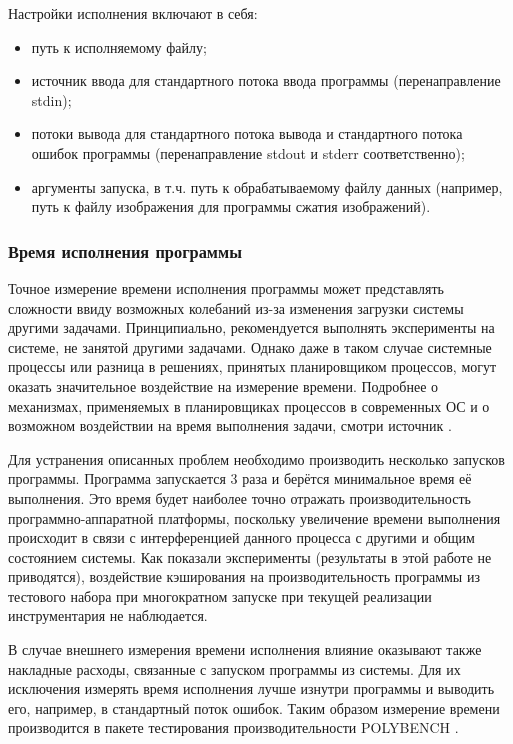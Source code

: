\begin{samepage}
Настройки исполнения включают в себя:
\nopagebreak
\begin{itemize}
    \item путь к исполняемому файлу;
    \item источник ввода для стандартного потока ввода программы (перенаправление stdin);
    \item потоки вывода для стандартного потока вывода и стандартного потока ошибок программы (перенаправление stdout и stderr соответственно);
    \item аргументы запуска, в т.ч. путь к обрабатываемому файлу данных (например, путь к файлу изображения для программы сжатия изображений).
\end{itemize}
\end{samepage}


\subsubsection{Время исполнения программы}
Точное измерение времени исполнения программы может представлять сложности ввиду возможных колебаний из-за изменения загрузки системы другими задачами. Принципиально, рекомендуется выполнять эксперименты на системе, не занятой другими задачами. Однако даже в таком случае системные процессы или разница в решениях, принятых планировщиком процессов, могут оказать значительное воздействие на измерение времени. Подробнее о механизмах, применяемых в планировщиках процессов в современных ОС и о возможном воздействии на время выполнения задачи, смотри источник \cite{scheduling}.

Для устранения описанных проблем необходимо производить несколько запусков программы. Программа запускается 3 раза и берётся минимальное время её выполнения. Это время будет наиболее точно отражать производительность программно-аппаратной платформы, поскольку увеличение времени выполнения происходит в связи с интерференцией данного процесса с другими и общим состоянием системы. Как показали эксперименты (результаты в этой работе не приводятся), воздействие кэширования на производительность программы из тестового набора при многократном запуске при текущей реализации инструментария не наблюдается.

В случае внешнего измерения времени исполнения влияние оказывают также накладные расходы, связанные с запуском программы из системы. Для их исключения измерять время исполнения лучше изнутри программы и выводить его, например, в стандартный поток ошибок. Таким образом измерение времени производится в пакете тестирования производительности POLYBENCH \cite{polybench}.

